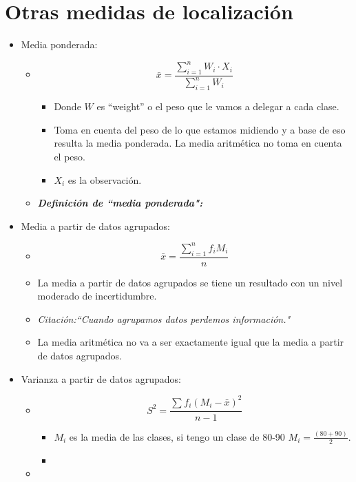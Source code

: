 \section{Otras medidas de localización}
\begin{itemize}
    \item Media ponderada: 
        \begin{itemize}
            \item \[
              \bar{x} = \frac{\sum_{i=1}^{n}W_i \cdot X_i} {\sum_{i=1}^{n}W_i} 
            \]
            \begin{itemize}
                \item Donde $W$ es ``weight'' o el peso que le vamos a delegar a cada clase.
                \item Toma en cuenta del peso de lo que estamos midiendo y a base de eso resulta la media ponderada. La media aritmética no toma en cuenta el peso.
                \item $X_i$ es la observación.
            \end{itemize}            
            \item \emph{\textbf{Definición de ``media ponderada":} }
        \end{itemize}
    \item Media a partir de datos agrupados: 
        \begin{itemize}
            \item \[
              \bar{x} = \frac{\sum_{i=1}^{n}f_iM_i}{n} 
            \]
            
            \item La media a partir de datos agrupados se tiene un resultado con un nivel moderado de incertidumbre. 
            \item \emph{Citación:``Cuando agrupamos datos perdemos información."}         
            \item La media aritmética no va a ser exactamente igual que la media a partir de datos agrupados.   
        \end{itemize}
    
    \item Varianza a partir de datos agrupados: 
        \begin{itemize}
            \item \[
              S^2= \frac{\sum_{}^{}f_i(M_i-\bar{x})^2}{n-1} 
            \]
                \begin{itemize}
                    \item $M_i$ es la media de las clases, si tengo un clase de 80-90 $M_i = \frac{(80+90)}{2}$.
                    \item  
                \end{itemize}
            \item 
        \end{itemize}
\end{itemize}

